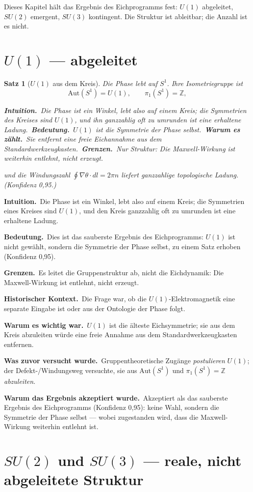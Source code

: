 \documentclass[10pt,twoside,openany]{book}
\newtheorem{theorem}{Satz}[chapter]
\newcommand{\theoremnotes}[3]{%
  \par\medskip\noindent
  \textbf{Intuition.}\ #1\par
  \textbf{Bedeutung.}\ #2\par
  \textbf{Grenzen.}\ #3\par}
\newcommand{\eqnotes}[4]{%
  \par\smallskip\noindent
  \textbf{Intuition.}\ #1\ 
  \textbf{Bedeutung.}\ #2\ 
  \textbf{Warum es zählt.}\ #3\ 
  \textbf{Grenzen.}\ #4\par}
\newcommand{\historynotes}[4]{%
  \par\smallskip\noindent
  \textbf{Historischer Kontext.}\ #1\par
  \textbf{Warum es wichtig war.}\ #2\par
  \textbf{Was zuvor versucht wurde.}\ #3\par
  \textbf{Warum das Ergebnis akzeptiert wurde.}\ #4\par}
\begin{document}
Dieses Kapitel hält das Ergebnis des Eichprogramms fest: $U(1)$ abgeleitet, $SU(2)$
emergent, $SU(3)$ kontingent. Die Struktur ist ableitbar; die Anzahl ist es nicht.

\section{$U(1)$ — abgeleitet}

\begin{theorem}[$U(1)$ aus dem Kreis]
Die Phase lebt auf $S^1$. Ihre Isometriegruppe ist
\begin{equation}
\mathrm{Aut}(S^1) = U(1), \qquad \pi_1(S^1) = \mathbb{Z},
\end{equation}

\eqnotes
{Die Phase ist ein Winkel, lebt also auf einem Kreis; die Symmetrien des Kreises sind
$U(1)$, und ihn ganzzahlig oft zu umrunden ist eine erhaltene Ladung.}
{$U(1)$ ist die Symmetrie der Phase selbst.}
{Sie entfernt eine freie Eichannahme aus dem Standardwerkzeugkasten.}
{Nur Struktur: Die Maxwell-Wirkung ist weiterhin entlehnt, nicht erzeugt.}
und die Windungszahl $\oint\nabla\theta\cdot dl = 2\pi n$ liefert ganzzahlige topologische
Ladung. (Konfidenz 0,95.)
\end{theorem}

\theoremnotes
{Die Phase ist ein Winkel, lebt also auf einem Kreis; die Symmetrien eines Kreises sind
$U(1)$, und den Kreis ganzzahlig oft zu umrunden ist eine erhaltene Ladung.}
{Dies ist das sauberste Ergebnis des Eichprogramms: $U(1)$ ist nicht gewählt, sondern die
Symmetrie der Phase selbst, zu einem Satz erhoben (Konfidenz 0,95).}
{Es leitet die Gruppenstruktur ab, nicht die Eichdynamik: Die Maxwell-Wirkung ist
entlehnt, nicht erzeugt.}

\historynotes
{Die Frage war, ob die $U(1)$-Elektromagnetik eine separate Eingabe ist oder aus der
Ontologie der Phase folgt.}
{$U(1)$ ist die älteste Eichsymmetrie; sie aus dem Kreis abzuleiten würde eine freie
Annahme aus dem Standardwerkzeugkasten entfernen.}
{Gruppentheoretische Zugänge \emph{postulieren} $U(1)$; der Defekt-/Windungsweg
versuchte, sie aus $\mathrm{Aut}(S^1)$ und $\pi_1(S^1)=\mathbb Z$ \emph{abzuleiten}.}
{Akzeptiert als das sauberste Ergebnis des Eichprogramms (Konfidenz 0,95): keine Wahl,
sondern die Symmetrie der Phase selbst --- wobei zugestanden wird, dass die
Maxwell-Wirkung weiterhin entlehnt ist.}

\section{$SU(2)$ und $SU(3)$ — reale, nicht abgeleitete Struktur}
\end{document}
